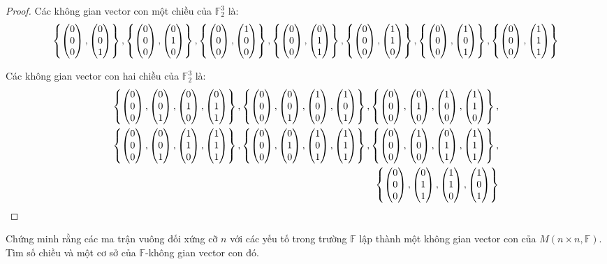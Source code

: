 \documentclass[class=linear-algebra,crop=false]{standalone}
\begin{document}
\begin{proof}
    Các không gian vector con một chiều của $\mathbb{F}^{3}_{2}$ là:
    \[
        \left\{
        \begin{pmatrix} 0 \\ 0 \\ 0 \end{pmatrix},
        \begin{pmatrix} 0 \\ 0 \\ 1 \end{pmatrix}
        \right\},
        \left\{
        \begin{pmatrix} 0 \\ 0 \\ 0 \end{pmatrix},
        \begin{pmatrix} 0 \\ 1 \\ 0 \end{pmatrix}
        \right\},
        \left\{
        \begin{pmatrix} 0 \\ 0 \\ 0 \end{pmatrix},
        \begin{pmatrix} 1 \\ 0 \\ 0 \end{pmatrix}
        \right\},
        \left\{
        \begin{pmatrix} 0 \\ 0 \\ 0 \end{pmatrix},
        \begin{pmatrix} 0 \\ 1 \\ 1 \end{pmatrix}
        \right\},
        \left\{
        \begin{pmatrix} 0 \\ 0 \\ 0 \end{pmatrix},
        \begin{pmatrix} 1 \\ 1 \\ 0 \end{pmatrix}
        \right\},
        \left\{
        \begin{pmatrix} 0 \\ 0 \\ 0 \end{pmatrix},
        \begin{pmatrix} 1 \\ 0 \\ 1 \end{pmatrix}
        \right\},
        \left\{
        \begin{pmatrix} 0 \\ 0 \\ 0 \end{pmatrix},
        \begin{pmatrix} 1 \\ 1 \\ 1 \end{pmatrix}
        \right\}
    \]
    \par Các không gian vector con hai chiều của $\mathbb{F}^{3}_{2}$ là:
    \[
        \begin{split}
            \left\{
            \begin{pmatrix} 0 \\ 0 \\ 0 \end{pmatrix},
            \begin{pmatrix} 0 \\ 0 \\ 1 \end{pmatrix},
            \begin{pmatrix} 0 \\ 1 \\ 0 \end{pmatrix},
            \begin{pmatrix} 0 \\ 1 \\ 1 \end{pmatrix}
            \right\},
            \left\{
            \begin{pmatrix} 0 \\ 0 \\ 0 \end{pmatrix},
            \begin{pmatrix} 0 \\ 0 \\ 1 \end{pmatrix},
            \begin{pmatrix} 1 \\ 0 \\ 0 \end{pmatrix},
            \begin{pmatrix} 1 \\ 0 \\ 1 \end{pmatrix}
            \right\},
            \left\{
            \begin{pmatrix} 0 \\ 0 \\ 0 \end{pmatrix},
            \begin{pmatrix} 0 \\ 1 \\ 0 \end{pmatrix},
            \begin{pmatrix} 1 \\ 0 \\ 0 \end{pmatrix},
            \begin{pmatrix} 1 \\ 1 \\ 0 \end{pmatrix}
            \right\},\\
            \left\{
            \begin{pmatrix} 0 \\ 0 \\ 0 \end{pmatrix},
            \begin{pmatrix} 0 \\ 0 \\ 1 \end{pmatrix},
            \begin{pmatrix} 1 \\ 1 \\ 0 \end{pmatrix},
            \begin{pmatrix} 1 \\ 1 \\ 1 \end{pmatrix}
            \right\},
            \left\{
            \begin{pmatrix} 0 \\ 0 \\ 0 \end{pmatrix},
            \begin{pmatrix} 0 \\ 1 \\ 0 \end{pmatrix},
            \begin{pmatrix} 1 \\ 0 \\ 1 \end{pmatrix},
            \begin{pmatrix} 1 \\ 1 \\ 1 \end{pmatrix}
            \right\},
            \left\{
            \begin{pmatrix} 0 \\ 0 \\ 0 \end{pmatrix},
            \begin{pmatrix} 1 \\ 0 \\ 0 \end{pmatrix},
            \begin{pmatrix} 0 \\ 1 \\ 1 \end{pmatrix},
            \begin{pmatrix} 1 \\ 1 \\ 1 \end{pmatrix}
            \right\}, \\
            \left\{
            \begin{pmatrix} 0 \\ 0 \\ 0 \end{pmatrix},
            \begin{pmatrix} 0 \\ 1 \\ 1 \end{pmatrix},
            \begin{pmatrix} 1 \\ 1 \\ 0 \end{pmatrix},
            \begin{pmatrix} 1 \\ 0 \\ 1 \end{pmatrix}
            \right\}
        \end{split}
    \]
\end{proof}

\begin{exercise}Chứng minh rằng các ma trận vuông đối xứng cỡ $n$ với các yếu tố trong trường $\mathbb{F}$ lập thành một không gian vector con của $M(n\times n,\mathbb{F})$. Tìm số chiều và một cơ sở của $\mathbb{F}$-không gian vector con đó.
\end{exercise}
\end{document}
